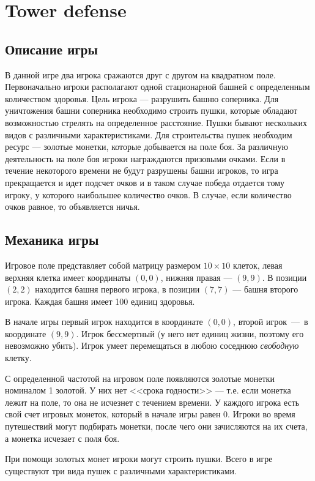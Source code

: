 \documentclass[14pt]{extarticle}
\newcommand{\sectionCenter}[1]{\section*{\centering #1}}
\begin{document}


\sectionCenter{Tower defense}

\subsection*{Описание игры}
В данной игре два игрока сражаются друг с другом на квадратном поле. Первоначально игроки располагают одной стационарной башней с определенным количеством здоровья. Цель игрока --- разрушить башню соперника. Для уничтожения башни соперника необходимо строить пушки, которые обладают возможностью стрелять на определенное расстояние. Пушки бывают нескольких видов с различными характеристиками. Для строительства пушек необходим ресурс --- золотые монетки, которые добывается на поле боя. За различную деятельность на поле боя игроки награждаются призовыми очками. Если в течение некоторого времени не будут разрушены башни игроков, то игра прекращается и идет подсчет очков и в таком случае победа отдается тому игроку, у которого наибольшее количество очков. В случае, если количество очков равное, то объявляется ничья.

\subsection*{Механика игры}
Игровое поле представляет собой матрицу размером $10 \times 10$ клеток, левая верхняя клетка имеет координаты $(0, 0)$, нижняя правая --- $(9, 9)$. В позиции $(2, 2)$ находится башня первого игрока, в позиции $(7, 7)$ --- башня второго игрока. Каждая башня имеет 100 единиц здоровья.

В начале игры первый игрок находится в координате $(0, 0)$, второй игрок~---~в координате $(9, 9)$. Игрок бессмертный (у него нет единиц жизни, поэтому его невозможно убить). Игрок умеет перемещаться в любою соседнюю \emph{свободную} клетку.

С определенной частотой на игровом поле появляются золотые монетки номиналом 1 золотой. У них нет <<срока годности>> --- т.е. если монетка лежит на поле, то она не исчезнет с течением времени. У каждого игрока есть свой счет игровых монеток, который в начале игры равен 0. Игроки во время путешествий могут подбирать монетки, после чего они зачисляются на их счета, а монетка исчезает с поля боя.

При помощи золотых монет игроки могут строить пушки. Всего в игре существуют три вида пушек с различными характеристиками.
\end{document}
